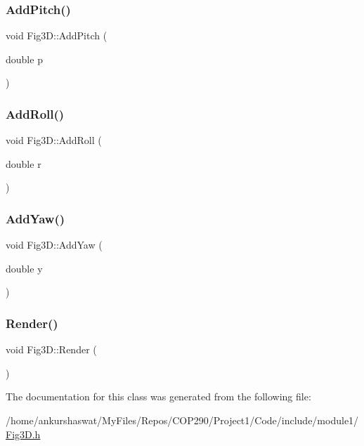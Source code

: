 \subsubsection{\texorpdfstring{Add\+Pitch()}{AddPitch()}}
{\footnotesize\ttfamily void Fig3\+D\+::\+Add\+Pitch (\begin{DoxyParamCaption}\item[{double}]{p }\end{DoxyParamCaption})}

\mbox{\label{classFig3D_af26cb06e501da42b688c9e67b8c9dba3}} 
\subsubsection{\texorpdfstring{Add\+Roll()}{AddRoll()}}
{\footnotesize\ttfamily void Fig3\+D\+::\+Add\+Roll (\begin{DoxyParamCaption}\item[{double}]{r }\end{DoxyParamCaption})}

\mbox{\label{classFig3D_ae44cbf728ebb3702cf064e2b5c7ce66f}} 
\subsubsection{\texorpdfstring{Add\+Yaw()}{AddYaw()}}
{\footnotesize\ttfamily void Fig3\+D\+::\+Add\+Yaw (\begin{DoxyParamCaption}\item[{double}]{y }\end{DoxyParamCaption})}

\mbox{\label{classFig3D_a7240f4cd944cfe9595cfb3d48fe422cd}} 
\subsubsection{\texorpdfstring{Render()}{Render()}}
{\footnotesize\ttfamily void Fig3\+D\+::\+Render (\begin{DoxyParamCaption}{ }\end{DoxyParamCaption})}



The documentation for this class was generated from the following file\+:\begin{DoxyCompactItemize}
\item 
/home/ankurshaswat/\+My\+Files/\+Repos/\+C\+O\+P290/\+Project1/\+Code/include/module1/\hyperlink{Fig3D_8h}{Fig3\+D.\+h}\end{DoxyCompactItemize}
